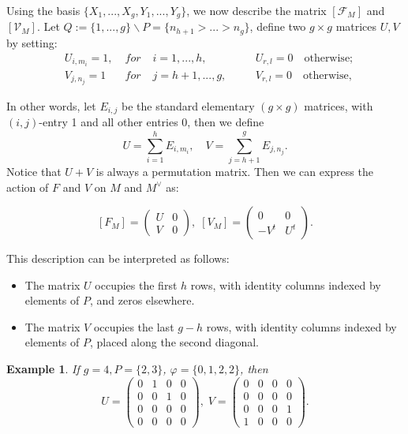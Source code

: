 \documentclass[a4paper,12pt,twoside]{report}
\newtheorem{example}[theorem]{Example}
\begin{document}
Using the basis $\{X_1,...,X_g,Y_1,...,Y_g\}$, we now describe the matrix $[\mathcal{F}_M]$ and $[\mathcal{V}_M]$.  
Let $Q:=\{1,...,g\}\backslash P=\{n_{h+1}>...>n_g\}$, 
define two $g\times g$ matrices $U,V$ by setting:
\[\begin{aligned}
    &U_{i, m_i}=1,\; &for\; &i=1,...,h, &\quad &U_{r,l}=0 \quad \text{otherwise}; \\
    &V_{j,n_j}=1\; &for\; &j=h+1,...,g,& \quad &V_{r,l}=0 \quad \text{otherwise},
\end{aligned}\]

In other words, let $E_{i,j}$ be the standard elementary $(g\times g)$ matrices, 
with $(i,j)$-entry 1 and all other entries 0, then we define 
\[U=\sum_{i=1}^h E_{i,m_i}, \quad V=\sum_{j=h+1}^g E_{j,n_j}.\]
Notice that $U+V$ is always a permutation matrix. 
Then we can express the action of $F$ and $V$ on $M$ and $M^{\vee}$ as: 

\[[F_M]=\left(\begin{matrix}
    U&0\\
    V&0
\end{matrix}\right),\; [V_M]= \left(\begin{matrix}
    0&0\\
    -V^t&U^t
\end{matrix}\right).\]

This description can be interpreted as follows: 
\begin{itemize}
    \item The matrix $U$ occupies the first $h$ rows, with identity columns indexed by elements of $P$, 
    and zeros elsewhere. 
    \item The matrix $V$ occupies the last $g-h$ rows, with identity columns indexed by elements of $P$, 
    placed along the second diagonal. 
\end{itemize}

\begin{example}
    If $g=4,P=\{2,3\}$, $\varphi=\{0,1,2,2\}$, then 
\[U=\left(\begin{matrix}
    0&1&0&0\\
    0&0&1&0\\
    0&0&0&0\\
    0&0&0&0
\end{matrix}\right),\; V=\left(\begin{matrix}
    0&0&0&0\\
    0&0&0&0\\
    0&0&0&1\\
    1&0&0&0
\end{matrix}\right).\]
\end{example}
\end{document}
